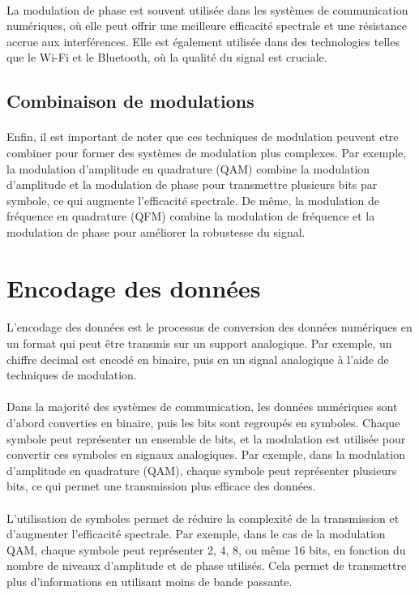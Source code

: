 \documentclass[a4paper,draft,twocolumn]{report}
\begin{document}
\paragraph{}La modulation de phase est souvent utilisée dans les systèmes de communication numériques, où elle peut offrir une meilleure efficacité spectrale et une résistance accrue aux interférences. Elle est également utilisée dans des technologies telles que le Wi-Fi et le Bluetooth, où la qualité du signal est cruciale.

\subsection{Combinaison de modulations}
\paragraph{}Enfin, il est important de noter que ces techniques de modulation peuvent etre combiner pour former des systèmes de modulation plus complexes. Par exemple, la modulation d'amplitude en quadrature (QAM) combine la modulation d'amplitude et la modulation de phase pour transmettre plusieurs bits par symbole, ce qui augmente l'efficacité spectrale. De même, la modulation de fréquence en quadrature (QFM) combine la modulation de fréquence et la modulation de phase pour améliorer la robustesse du signal.

\section{Encodage des données}

\paragraph{}L'encodage des données est le processus de conversion des données numériques en un format qui peut être transmis sur un support analogique. Par exemple, un chiffre decimal est encodé en binaire, puis en un signal analogique à l'aide de techniques de modulation.
\paragraph{}Dans la majorité des systèmes de communication, les données numériques sont d'abord converties en binaire, puis les bits sont regroupés en symboles. Chaque symbole peut représenter un ensemble de bits, et la modulation est utilisée pour convertir ces symboles en signaux analogiques. Par exemple, dans la modulation d'amplitude en quadrature (QAM), chaque symbole peut représenter plusieurs bits, ce qui permet une transmission plus efficace des données.
\paragraph{}L'utilisation de symboles permet de réduire la complexité de la transmission et d'augmenter l'efficacité spectrale. Par exemple, dans le cas de la modulation QAM, chaque symbole peut représenter 2, 4, 8, ou même 16 bits, en fonction du nombre de niveaux d'amplitude et de phase utilisés. Cela permet de transmettre plus d'informations en utilisant moins de bande passante.
\end{document}
